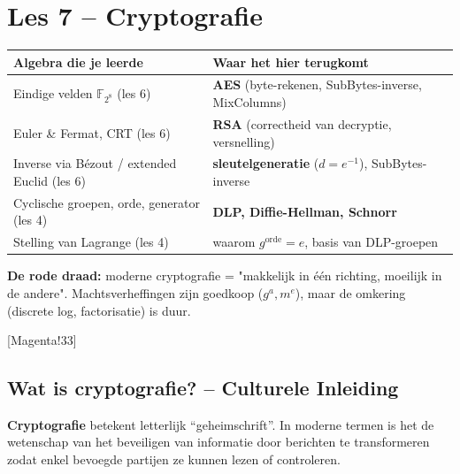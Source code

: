 \section{Les 7 -- Cryptografie}

\begin{center}
    \renewcommand{\arraystretch}{1.5}
    \begin{tabularx}{\linewidth}{@{} >{\hsize}L >{\hsize}L @{}}
        \textbf{Algebra die je leerde} & \textbf{Waar het hier terugkomt} \\
        \hline
        Eindige velden $\mathbb{F}_{2^8}$ (les 6) & \textbf{AES} (byte-rekenen, SubBytes-inverse, MixColumns) \\
        \thinrule
        Euler \& Fermat, CRT (les 6) & \textbf{RSA} (correctheid van decryptie, versnelling) \\
        \thinrule
        Inverse via Bézout / extended Euclid (les 6) & \textbf{sleutelgeneratie} ($d = e^{-1}$), SubBytes-inverse \\
        \thinrule
        Cyclische groepen, orde, generator (les 4) & \textbf{DLP, Diffie-Hellman, Schnorr} \\
        \thinrule
        Stelling van Lagrange (les 4) & waarom $g^{\text{orde}} = e$, basis van DLP-groepen \\
        \hline
    \end{tabularx}
\end{center}

\begin{barbox}[RoyalPurple!75][gray!3]
    \textcolor{RoyalPurple!75}{\textbf{De rode draad:}} moderne cryptografie = "makkelijk in één richting, moeilijk in de andere". Machtsverheffingen zijn goedkoop ($g^a, m^e$), maar de omkering (discrete log, factorisatie) is duur.
\end{barbox}

\begin{center}
    [Magenta!33]
\end{center}

\subsection{Wat is cryptografie? -- Culturele Inleiding}

\textbf{Cryptografie} betekent letterlijk “geheimschrift”. In moderne termen is het de wetenschap van het beveiligen van informatie door berichten te transformeren zodat enkel bevoegde partijen ze kunnen lezen of controleren.

